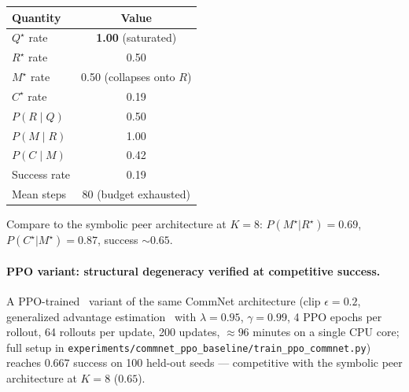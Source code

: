\documentclass{article}
\begin{document}
\begin{table}[h]
\centering
\small
\begin{tabular}{l c}
\toprule
Quantity & Value \\
\midrule
$Q^\star$ rate                              & \textbf{1.00} (saturated) \\
$R^\star$ rate                              & 0.50 \\
$M^\star$ rate                              & 0.50 (collapses onto $R$) \\
$C^\star$ rate                              & 0.19 \\
$P(R \mid Q)$                               & 0.50 \\
$P(M \mid R)$                               & 1.00 \\
$P(C \mid M)$                               & 0.42 \\
Success rate                                & 0.19 \\
Mean steps                                  & 80 (budget exhausted) \\
\bottomrule
\end{tabular}
\end{table}

Compare to the symbolic peer architecture at $K{=}8$: $P(M^\star|R^\star){=}0.69$, $P(C^\star|M^\star){=}0.87$, success $\sim 0.65$.

\paragraph{PPO variant: structural degeneracy verified at competitive success.}
A PPO-trained~\citep{schulman2017proximal} variant of the same CommNet architecture (clip $\epsilon{=}0.2$, generalized advantage estimation~\citep{schulman2016gae} with $\lambda{=}0.95$, $\gamma{=}0.99$, 4 PPO epochs per rollout, 64 rollouts per update, 200 updates, $\approx 96$ minutes on a single CPU core; full setup in \texttt{experiments/commnet\_ppo\_baseline/train\_ppo\_commnet.py}) reaches $0.667$ success on 100 held-out seeds --- competitive with the symbolic peer architecture at $K{=}8$ ($0.65$).
\end{document}
